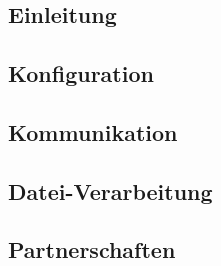 \chapter{\sblitg}
\renewcommand{\kapitelautor}{Autor: Nikola Szucsich}

\section{Einleitung} \label{Einleitung}


\section{Konfiguration} \label{Konfiguration}


\section{Kommunikation} \label{Kommunikation}


\section{Datei-Verarbeitung} \label{Dateiverarbeitung}


\section{Partnerschaften} \label{Partnerschaften}
